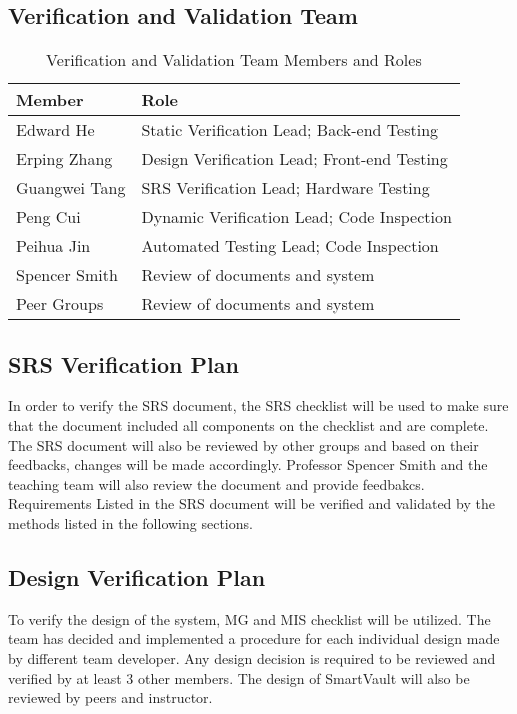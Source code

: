 \documentclass[12pt, titlepage]{article}
\begin{document}
\subsection{Verification and Validation Team}

\begin{table}[h]
\begin{center}
\begin{tabular}{|l | l|}
\hline
  \textbf{Member} & \textbf{Role}\\
  \hline
  Edward He & Static Verification Lead; Back-end Testing\\
  \hline
  Erping Zhang & Design Verification Lead; Front-end Testing \\
  \hline
  Guangwei Tang & SRS Verification Lead; Hardware Testing\\
  \hline
  Peng Cui & Dynamic Verification Lead; Code Inspection\\
  \hline
  Peihua Jin & Automated Testing Lead; Code Inspection\\
  \hline
  Spencer Smith & Review of documents and system\\
  \hline
  Peer Groups & Review of documents and system\\
  \hline
\end{tabular}
\end{center}
\caption{Verification and Validation Team Members and Roles}            

\end{table}
\break
\subsection{SRS Verification Plan}

In order to verify the SRS document, the SRS checklist will be used to make sure that the document included all components on the checklist and are complete. The SRS document will also be reviewed by other groups and based on their feedbacks, changes will be made accordingly. Professor Spencer Smith and the teaching team will also review the document and provide feedbakcs. Requirements Listed in the SRS document will be verified and validated by the methods listed in the following sections.



\subsection{Design Verification Plan}

To verify the design of the system, MG and MIS checklist will be utilized. The team has decided and implemented a procedure for each individual design made by different team developer. Any design decision is required to be reviewed and verified by at least 3 other members. The design of SmartVault will also be reviewed by peers and instructor. 
\end{document}
